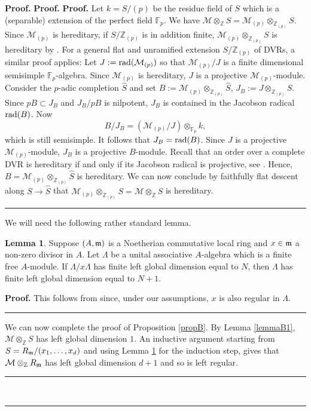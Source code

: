 \documentclass[reqno,11pt,letterpaper]{amsart}
\theoremstyle{plain}
\numberwithin{equation}{subsection}
\newtheorem{lemma}[equation]{Lemma}
\theoremstyle{remark}
\theoremstyle{plain}
\theoremstyle{definition}\newtheorem*{notation}{Notation}
\newcommand{\M}{{\mathcal M}}
\newtheorem{lemma}[theorem]{Lemma}
\newenvironment{proof}[1][Proof]{\noindent\textbf{#1.} }{\ \rule{0.5em}{0.5em}}
\newcommand{\BZ}{\mathbb{Z}}
\newcommand{\BF}{{\mathbb F}}
\begin{document}
\begin{proof}
\begin{proof}
 \begin{proof} Let
 $k=S/(p)$ be the residue field of $S$ which is a (separable) extension of the perfect field $\BF_p$. 
 We have $\M\otimes_\BZ S=\M_{(p)}\otimes_{\BZ_{(p)}}S$. Since $\M_{(p)}$ is hereditary, if $S/\BZ_{(p)}$ is in addition finite,
 $\M_{(p)}\otimes_{\BZ_{(p)}}S$ is hereditary by \cite{Jan}. For a general flat and unramified extension $S/\BZ_{(p)}$ of DVRs, 
 a similar proof applies: Let $J:={\rm rad}(\M_{(p)})$ so that $\M_{(p)}/J$ is a finite dimensional semisimple $\BF_p$-algebra. 
  Since  $\M_{(p)}$ is hereditary, $J$ is a projective $\M_{(p)}$-module.
Consider the $p$-adic completion $\hat S$ and set $B:=\M_{(p)}\otimes_{\BZ_{(p)}}\hat S$, $J_B:=J\otimes_{\BZ_{(p)}}\hat S$.
Since $pB\subset J_B$ and $J_B/pB$ is nilpotent, $J_B$ is contained in the Jacobson radical ${\rm rad}(B)$. Now
\[
B/J_B=(\M_{(p)}/J)\otimes_{\BF_p}k,
\]
which is still semisimple. It follows that $J_B={\rm rad}(B)$. Since 
$J$ is a projective $\M_{(p)}$-module, $J_B$ is a projective $B$-module.
Recall that an order over a complete DVR is hereditary if and only if its Jacobson radical is projective, see \cite[Thm. (39.1)]{Reiner}.
Hence, $B=\M_{(p)}\otimes_{\BZ_{(p)}}\hat S$ is hereditary.  We can now conclude by faithfully flat descent along $S\to \hat S$ that $\M_{(p)}\otimes_{\BZ_{(p)}}S=\M\otimes_\BZ S$
is hereditary.
 \end{proof}


We will  need the following
rather standard lemma.
 
 \begin{lemma}\label{lemmaB2}
 Suppose $(A,\frak m)$ is a Noetherian commutative local ring and $x\in \frak m$ a non-zero divisor in $A$. 
 Let $\Lambda$ be a unital associative $A$-algebra which is a finite  free $A$-module. If $\Lambda/x\Lambda$ has finite left global dimension equal to $N$,
 then $\Lambda$ has finite left global dimension equal to $N+1$.
 \end{lemma}
 
 \begin{proof} This follows from \cite[Prop. 5.6]{Ramras} since, under our assumptions, $x$ is also regular in $\Lambda$. 
 \end{proof}
 
 
 
 
 We can now complete the proof of Proposition \ref{propB}. By Lemma \ref{lemmaB1}, $\M\otimes_\BZ S$  has left global dimension $1$. 
 An inductive argument starting from $S=R_{\frak m}/(x_1,\ldots, x_d)$ and using Lemma \ref{lemmaB2} for the induction step, 
 gives that
 $\M\otimes_{\BZ}R_{\frak m}$ has left global dimension $d+1$ and so is left regular. \end{proof}
 \smallskip
 

\end{proof}
\end{document}
